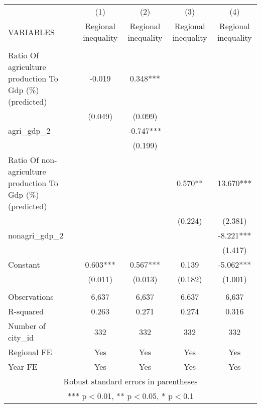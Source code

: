 \documentclass[]{article}
\begin{document}
\begin{tabular}{lcccc} \hline
 & (1) & (2) & (3) & (4) \\
VARIABLES & Regional inequality & Regional inequality & Regional inequality & Regional inequality \\ \hline
 &  &  &  &  \\
Ratio Of agriculture production To Gdp (\%) (predicted) & -0.019 & 0.348*** &  &  \\
 & (0.049) & (0.099) &  &  \\
agri\_gdp\_2 &  & -0.747*** &  &  \\
 &  & (0.199) &  &  \\
Ratio Of non-agriculture production To Gdp (\%) (predicted) &  &  & 0.570** & 13.670*** \\
 &  &  & (0.224) & (2.381) \\
nonagri\_gdp\_2 &  &  &  & -8.221*** \\
 &  &  &  & (1.417) \\
Constant & 0.603*** & 0.567*** & 0.139 & -5.062*** \\
 & (0.011) & (0.013) & (0.182) & (1.001) \\
 &  &  &  &  \\
Observations & 6,637 & 6,637 & 6,637 & 6,637 \\
R-squared & 0.263 & 0.271 & 0.274 & 0.316 \\
Number of city\_id & 332 & 332 & 332 & 332 \\
Regional FE & Yes & Yes & Yes & Yes \\
 Year FE & Yes & Yes & Yes & Yes \\ \hline
\multicolumn{5}{c}{ Robust standard errors in parentheses} \\
\multicolumn{5}{c}{ *** p$<$0.01, ** p$<$0.05, * p$<$0.1} \\
\end{tabular}
\end{document}
